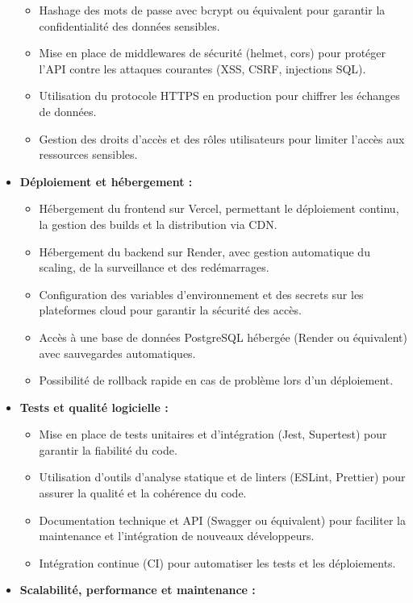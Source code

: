 \documentclass[12pt,a4paper]{report}
\begin{document}
\begin{itemize}
\begin{itemize}
        \item Hashage des mots de passe avec bcrypt ou équivalent pour garantir la confidentialité des données sensibles.
        \item Mise en place de middlewares de sécurité (helmet, cors) pour protéger l’API contre les attaques courantes (XSS, CSRF, injections SQL).
        \item Utilisation du protocole HTTPS en production pour chiffrer les échanges de données.
        \item Gestion des droits d’accès et des rôles utilisateurs pour limiter l’accès aux ressources sensibles.
    \end{itemize}
    \item \textbf{Déploiement et hébergement :}
    \begin{itemize}
        \item Hébergement du frontend sur Vercel, permettant le déploiement continu, la gestion des builds et la distribution via CDN.
        \item Hébergement du backend sur Render, avec gestion automatique du scaling, de la surveillance et des redémarrages.
        \item Configuration des variables d’environnement et des secrets sur les plateformes cloud pour garantir la sécurité des accès.
        \item Accès à une base de données PostgreSQL hébergée (Render ou équivalent) avec sauvegardes automatiques.
        \item Possibilité de rollback rapide en cas de problème lors d’un déploiement.
    \end{itemize}
    \item \textbf{Tests et qualité logicielle :}
    \begin{itemize}
        \item Mise en place de tests unitaires et d’intégration (Jest, Supertest) pour garantir la fiabilité du code.
        \item Utilisation d’outils d’analyse statique et de linters (ESLint, Prettier) pour assurer la qualité et la cohérence du code.
        \item Documentation technique et API (Swagger ou équivalent) pour faciliter la maintenance et l’intégration de nouveaux développeurs.
        \item Intégration continue (CI) pour automatiser les tests et les déploiements.
    \end{itemize}
    \item \textbf{Scalabilité, performance et maintenance :}

\end{itemize}
\end{document}
